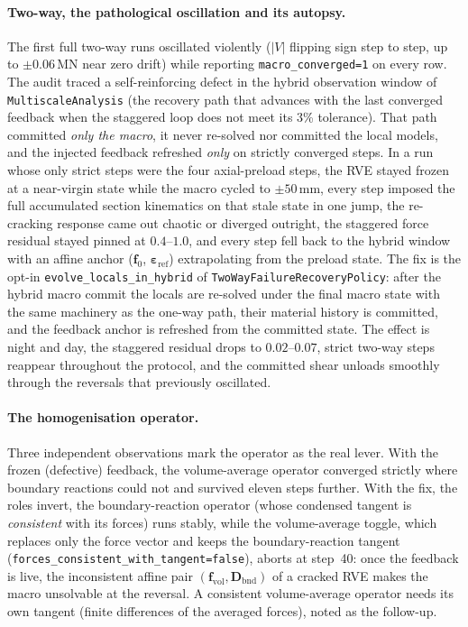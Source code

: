 \paragraph{Two-way, the pathological oscillation and its autopsy.}
The first full two-way runs oscillated violently ($|V|$ flipping sign
step to step, up to $\pm 0.06$\,MN near zero drift) while reporting
\texttt{macro\_converged=1} on every row. The audit traced a
self-reinforcing defect in the hybrid observation window of
\texttt{MultiscaleAnalysis} (the recovery path that advances with the
last converged feedback when the staggered loop does not meet its 3\%
tolerance). That path committed \emph{only the macro}, it never
re-solved nor committed the local models, and the injected feedback
refreshed \emph{only} on strictly converged steps. In a run whose only
strict steps were the four axial-preload steps, the RVE stayed frozen
at a near-virgin state while the macro cycled to $\pm 50$\,mm, every
step imposed the full accumulated section kinematics on that stale
state in one jump, the re-cracking response came out chaotic or
diverged outright, the staggered force residual stayed pinned at
$0.4$--$1.0$, and every step fell back to the hybrid window with an
affine anchor ($\mathbf f_0$, $\boldsymbol\varepsilon_{\mathrm{ref}}$)
extrapolating from the preload state. The fix is the opt-in
\texttt{evolve\_locals\_in\_hybrid} of
\texttt{TwoWayFailureRecoveryPolicy}: after the hybrid macro commit the
locals are re-solved under the final macro state with the same
machinery as the one-way path, their material history is committed,
and the feedback anchor is refreshed from the committed state. The
effect is night and day, the staggered residual drops to
$0.02$--$0.07$, strict two-way steps reappear throughout the protocol,
and the committed shear unloads smoothly through the reversals that
previously oscillated.

\paragraph{The homogenisation operator.} Three independent
observations mark the operator as the real lever. With the frozen
(defective) feedback, the volume-average operator converged strictly
where boundary reactions could not and survived eleven steps further.
With the fix, the roles invert, the boundary-reaction operator (whose
condensed tangent is \emph{consistent} with its forces) runs stably,
while the volume-average toggle, which replaces only the force vector
and keeps the boundary-reaction tangent
(\texttt{forces\_consistent\_with\_tangent=false}), aborts at step~40:
once the feedback is live, the inconsistent affine pair
$(\mathbf f_{\mathrm{vol}}, \mathbf D_{\mathrm{bnd}})$ of a cracked RVE
makes the macro unsolvable at the reversal. A consistent volume-average
operator needs its own tangent (finite differences of the averaged
forces), noted as the follow-up.

